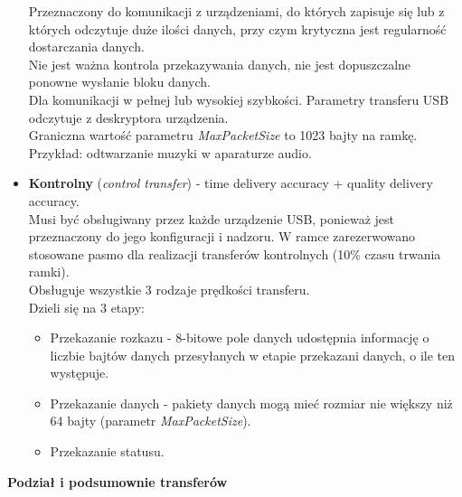 \begin{itemize}
			Przeznaczony do komunikacji z urządzeniami, do których zapisuje się lub z których odczytuje duże ilości danych, przy czym krytyczna jest regularność dostarczania danych.\\
			Nie jest ważna kontrola przekazywania danych, nie jest dopuszczalne ponowne wysłanie bloku danych.\\
			Dla komunikacji w pełnej lub wysokiej szybkości. Parametry transferu USB odczytuje z deskryptora urządzenia.\\
			Graniczna wartość parametru \emph{MaxPacketSize} to 1023 bajty na ramkę.\\
			Przykład: odtwarzanie muzyki w aparaturze audio.
			\item \textbf{Kontrolny} (\emph{control transfer}) - time delivery accuracy + quality delivery accuracy.\\
			Musi być obsługiwany przez każde urządzenie USB, ponieważ jest przeznaczony do jego konfiguracji i nadzoru. W ramce zarezerwowano stosowane pasmo dla realizacji transferów kontrolnych (10\% czasu trwania ramki).\\
			Obsługuje wszystkie 3 rodzaje prędkości transferu.\\
			Dzieli się na 3 etapy:
			\begin{itemize}
				\item Przekazanie rozkazu - 8-bitowe pole danych udostępnia informację o liczbie bajtów danych przesyłanych w etapie przekazani danych, o ile ten występuje.
				\item Przekazanie danych - pakiety danych mogą mieć rozmiar nie większy niż 64 bajty (parametr \emph{MaxPacketSize}).
				\item Przekazanie statusu.
			\end{itemize}
		\end{itemize}
		\textbf{Podział i podsumownie transferów}
